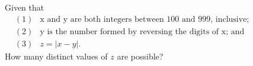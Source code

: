 Given that
\begin{eqnarray*}&(1)& \text{x and y are both integers between 100 and 999, inclusive;}\qquad \qquad \qquad \qquad \qquad \\ &(2)& \text{y is the number formed by reversing the digits of x; and}\\ &(3)& z=|x-y|. \end{eqnarray*}How many distinct values of $z$ are possible?